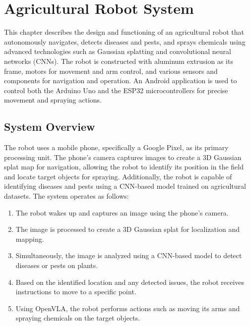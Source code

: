 
\chapter{Agricultural Robot System}

This chapter describes the design and functioning of an agricultural robot that autonomously navigates, detects diseases and pests, and sprays chemicals using advanced technologies such as Gaussian splatting and convolutional neural networks (CNNs). The robot is constructed with aluminum extrusion as its frame, motors for movement and arm control, and various sensors and components for navigation and operation. An Android application is used to control both the Arduino Uno and the ESP32 microcontrollers for precise movement and spraying actions.

\section{System Overview}

The robot uses a mobile phone, specifically a Google Pixel, as its primary processing unit. \cite{müller2021openbotturningsmartphonesrobots} The phone's camera captures images to create a 3D Gaussian splat map for navigation, allowing the robot to identify its position in the field and locate target objects for spraying. Additionally, the robot is capable of identifying diseases and pests using a CNN-based model trained on agricultural datasets. The system operates as follows:

\begin{enumerate}
    \item The robot wakes up and captures an image using the phone's camera.
    \item The image is processed to create a 3D Gaussian splat for localization and mapping.\cite{chen2024splatnavsaferealtimerobot} \cite{bortolon20246dgs6dposeestimation}
    \item Simultaneously, the image is analyzed using a CNN-based model to detect diseases or pests on plants.\cite{10353343}
    \item Based on the identified location and any detected issues, the robot receives instructions to move to a specific point.\cite{DURAKLI2022101540}
    \item Using OpenVLA, the robot performs actions such as moving its arms and spraying chemicals on the target objects. \cite{kim2024openvlaopensourcevisionlanguageactionmodel}
\end{enumerate}

